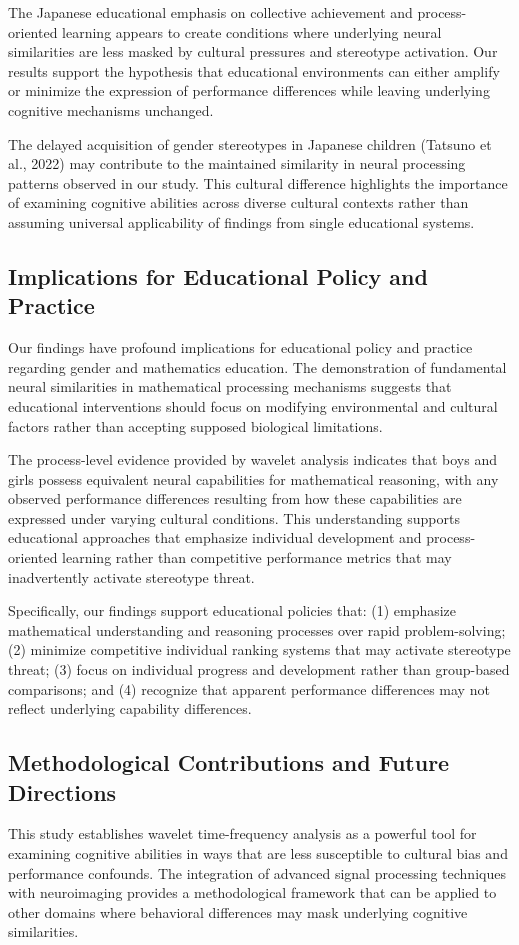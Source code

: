\documentclass[12pt, a4paper]{article}
\begin{document}
The Japanese educational emphasis on collective achievement and process-oriented learning appears to create conditions where underlying neural similarities are less masked by cultural pressures and stereotype activation. Our results support the hypothesis that educational environments can either amplify or minimize the expression of performance differences while leaving underlying cognitive mechanisms unchanged.

The delayed acquisition of gender stereotypes in Japanese children (Tatsuno et al., 2022) may contribute to the maintained similarity in neural processing patterns observed in our study. This cultural difference highlights the importance of examining cognitive abilities across diverse cultural contexts rather than assuming universal applicability of findings from single educational systems.


\subsection{Implications for Educational Policy and Practice}
Our findings have profound implications for educational policy and practice regarding gender and mathematics education. The demonstration of fundamental neural similarities in mathematical processing mechanisms suggests that educational interventions should focus on modifying environmental and cultural factors rather than accepting supposed biological limitations.

The process-level evidence provided by wavelet analysis indicates that boys and girls possess equivalent neural capabilities for mathematical reasoning, with any observed performance differences resulting from how these capabilities are expressed under varying cultural conditions. This understanding supports educational approaches that emphasize individual development and process-oriented learning rather than competitive performance metrics that may inadvertently activate stereotype threat.

Specifically, our findings support educational policies that: (1) emphasize mathematical understanding and reasoning processes over rapid problem-solving; (2) minimize competitive individual ranking systems that may activate stereotype threat; (3) focus on individual progress and development rather than group-based comparisons; and (4) recognize that apparent performance differences may not reflect underlying capability differences.


\subsection{Methodological Contributions and Future Directions}
This study establishes wavelet time-frequency analysis as a powerful tool for examining cognitive abilities in ways that are less susceptible to cultural bias and performance confounds. The integration of advanced signal processing techniques with neuroimaging provides a methodological framework that can be applied to other domains where behavioral differences may mask underlying cognitive similarities.
\end{document}
